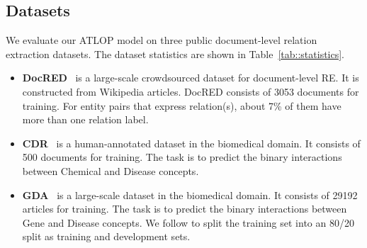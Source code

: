 \documentclass[letterpaper]{article}
\begin{document}
\begin{table}[!t]
\centering
{}
    \caption{Test  score (\%) on CDR and GDA dataset. Our ATLOP model with the SciBERT encoder outperforms the current SOTA results.
    }
    \label{tab::bio_result}
\end{table}

\subsection{Datasets}
We evaluate our ATLOP model on three public document-level relation extraction datasets.
The dataset statistics are shown in Table~\ref{tab::statistics}.
\begin{itemize}
    \item \textbf{DocRED}~\cite{Yao2019DocREDAL} is a large-scale crowdsourced dataset for document-level RE.
    It is constructed from Wikipedia articles.
    DocRED consists of 3053 documents for training.
    For entity pairs that express relation(s), about 7\% of them have more than one relation label.
    \item \textbf{CDR}~\cite{Li2016BioCreativeVC} is a human-annotated dataset in the biomedical domain.
    It consists of 500 documents for training.
    The task is to predict the binary interactions between Chemical and Disease concepts.
    \item \textbf{GDA}~\cite{Wu2019RENETAD} is a large-scale dataset in the biomedical domain.
    It consists of 29192 articles for training.
    The task is to predict the binary interactions between Gene and Disease concepts.
    We follow \citet{Christopoulou2019ConnectingTD} to split the training set into an 80/20 split as training and development sets.
\end{itemize}
\end{document}
